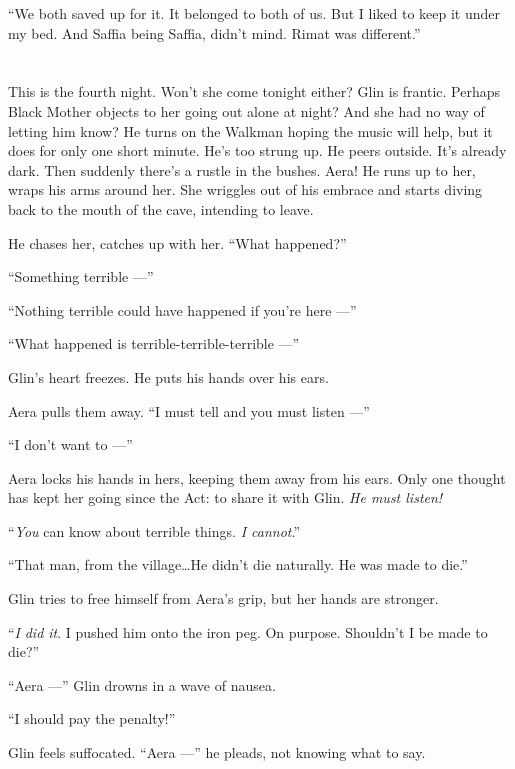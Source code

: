 \documentclass[twoside,11pt,openany]{book}
\begin{document}
``We both saved up for it. It belonged to both of us. But I liked to keep it under my bed. And Saffia being Saffia,
didn't mind. Rimat was different.''


\bigskip

\chapter{}

This is the fourth night. Won't she come tonight either? Glin is frantic. Perhaps Black Mother objects to her going out
alone at night? And she had no way of letting him know? He turns on the Walkman hoping the music will help, but it does
for only one short minute. He's too strung up. He peers outside. It's already dark. Then suddenly there's a rustle in
the bushes. Aera! He runs up to her, wraps his arms around her. She wriggles out of his embrace and starts diving back
to the mouth of the cave, intending to leave.

 He chases her, catches up with her. ``What happened?''

``Something terrible ---''

``Nothing terrible could have happened if you're here ---''

``What happened is terrible-terrible-terrible ---''

Glin's heart freezes. He puts his hands over his ears.

Aera pulls them away. ``I must tell and you must listen ---''

``I don't want to ---''

Aera locks his hands in hers, keeping them away from his ears. Only one thought has kept her going since the
Act:  to share it with Glin. \textit{He must listen! }

``\textit{You} can know about terrible things. \textit{I cannot}.''

``That man, from the village{\ldots}He didn't die naturally. He was made to die.''

Glin tries to free himself from Aera's grip, but her hands are stronger.

``\textit{I} \textit{did it}. I pushed him onto the iron peg. On purpose. Shouldn't I be made to
die?''

``Aera ---'' Glin drowns in a wave of nausea.

``I should pay the penalty!''

Glin feels suffocated. ``Aera ---'' he pleads, not knowing what to say.
\end{document}
